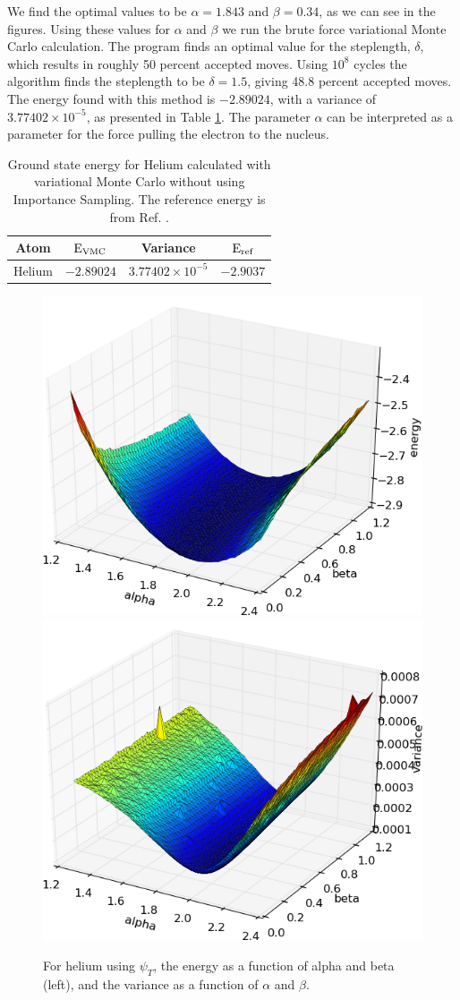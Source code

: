 		We find the optimal values to be  $\alpha=1.843$ and $\beta=0.34$, as we can see in the figures.
		Using these values for $\alpha$ and $\beta$ we run the brute force variational Monte Carlo calculation. The program finds an optimal value for the steplength, $\delta$, which results in roughly 50 percent accepted moves. Using $10^{8}$ cycles the algorithm finds the steplength to be $\delta = 1.5$, giving 48.8 percent accepted moves. The energy found with this method is $-2.89024$, with a variance of $3.77402\times10^{-5}$, as presented in Table \ref{tab:Helium_no_IS}.
		The parameter $\alpha$ can be interpreted as a parameter for the
		force pulling the electron to the nucleus.

		\begin{table}
			\center
			\begin{tabular}{c|c|c|c}
			   	Atom  & $\mbox{E}_{\mbox{\scriptsize{VMC}}}$ & Variance & $\mbox{E}_{\mbox{\scriptsize{ref}}}$ \tabularnewline
				\hline 
				Helium & $-2.89024$ & $3.77402\times10^{-5}$ & $-2.9037$ \tabularnewline
			\end{tabular}%
			\caption{Ground state energy for Helium calculated with variational Monte Carlo without using Importance Sampling. The reference energy is from Ref. \cite{Binkley_1975}.}
			\label{tab:Helium_no_IS}
		\end{table}
		


		\begin{figure}
			\centering \includegraphics[width=0.49\linewidth]{content/Results/figures/HeliumJastrowAnalytical_alpha_beta_energy}
			\includegraphics[width=0.49\linewidth]{content/Results/figures/HeliumJastrowAnalytical_alpha_beta_variance}
			\protect\caption{For helium using $\psi_{T}$, the energy as a function of alpha and beta (left), and the variance as a function of $\alpha$ and $\beta$. }
			\label{fig:HeliumAlphaBeta}
		\end{figure}

